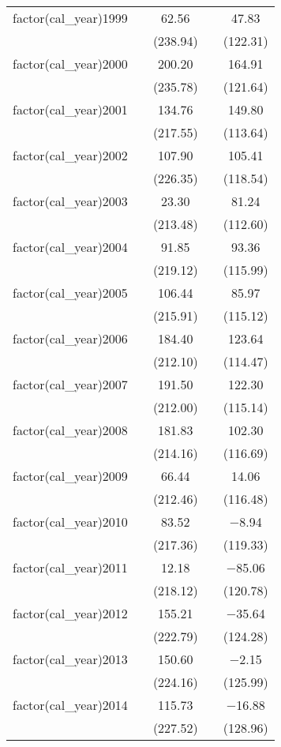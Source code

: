 \begin{table}[!htbp]
\begin{tabular}{@{\extracolsep{5pt}}lcccc}
  factor(cal\_year)1999 &  & 62.56 &  & 47.83 \\ 
  &  & (238.94) &  & (122.31) \\ 
  factor(cal\_year)2000 &  & 200.20 &  & 164.91 \\ 
  &  & (235.78) &  & (121.64) \\ 
  factor(cal\_year)2001 &  & 134.76 &  & 149.80 \\ 
  &  & (217.55) &  & (113.64) \\ 
  factor(cal\_year)2002 &  & 107.90 &  & 105.41 \\ 
  &  & (226.35) &  & (118.54) \\ 
  factor(cal\_year)2003 &  & 23.30 &  & 81.24 \\ 
  &  & (213.48) &  & (112.60) \\ 
  factor(cal\_year)2004 &  & 91.85 &  & 93.36 \\ 
  &  & (219.12) &  & (115.99) \\ 
  factor(cal\_year)2005 &  & 106.44 &  & 85.97 \\ 
  &  & (215.91) &  & (115.12) \\ 
  factor(cal\_year)2006 &  & 184.40 &  & 123.64 \\ 
  &  & (212.10) &  & (114.47) \\ 
  factor(cal\_year)2007 &  & 191.50 &  & 122.30 \\ 
  &  & (212.00) &  & (115.14) \\ 
  factor(cal\_year)2008 &  & 181.83 &  & 102.30 \\ 
  &  & (214.16) &  & (116.69) \\ 
  factor(cal\_year)2009 &  & 66.44 &  & 14.06 \\ 
  &  & (212.46) &  & (116.48) \\ 
  factor(cal\_year)2010 &  & 83.52 &  & $-$8.94 \\ 
  &  & (217.36) &  & (119.33) \\ 
  factor(cal\_year)2011 &  & 12.18 &  & $-$85.06 \\ 
  &  & (218.12) &  & (120.78) \\ 
  factor(cal\_year)2012 &  & 155.21 &  & $-$35.64 \\ 
  &  & (222.79) &  & (124.28) \\ 
  factor(cal\_year)2013 &  & 150.60 &  & $-$2.15 \\ 
  &  & (224.16) &  & (125.99) \\ 
  factor(cal\_year)2014 &  & 115.73 &  & $-$16.88 \\ 
  &  & (227.52) &  & (128.96) \\ 

\end{tabular}
\end{table}
